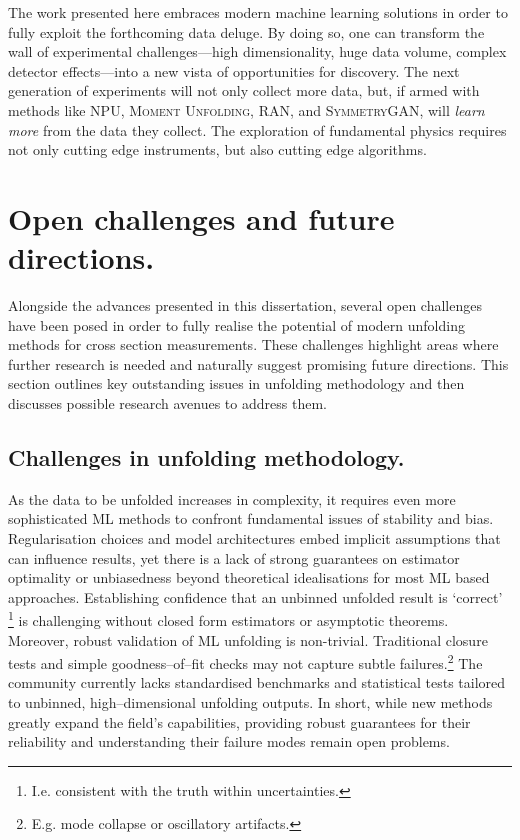         The work presented here embraces modern machine learning solutions in order to fully exploit the forthcoming data deluge.
        By doing so, one can transform the wall of experimental challenges---high dimensionality, huge data volume, complex detector effects---into a new vista of opportunities for discovery.
        The next generation of experiments will not only collect more data, but, if armed with methods like NPU, \textsc{Moment Unfolding}, RAN, and \textsc{SymmetryGAN}, will \emph{learn more} from the data they collect.
        The exploration of fundamental physics requires not only cutting edge instruments, but also cutting edge algorithms.

\section{Open challenges and future directions.}
\sectionminitoc
    Alongside the advances presented in this dissertation, several open challenges have been posed in order to fully realise the potential of modern unfolding methods for cross section measurements.
    These challenges highlight areas where further research is needed and naturally suggest promising future directions.
    This section outlines key outstanding issues in unfolding methodology and then discusses possible research avenues to address them.
        
    \subsection{Challenges in unfolding methodology.}
        As the data to be unfolded increases in complexity, it requires even more sophisticated ML methods to confront fundamental issues of stability and bias.
        Regularisation choices and model architectures embed implicit assumptions that can influence results, yet there is a lack of strong guarantees on estimator optimality or unbiasedness beyond theoretical idealisations for most ML based approaches.
        Establishing confidence that an unbinned unfolded result is `correct' \footnote{I.e. consistent with the truth within uncertainties.} is challenging without closed form estimators or asymptotic theorems.
        Moreover, robust validation of ML unfolding is non-trivial.
        Traditional closure tests and simple goodness--of--fit checks may not capture subtle failures.\footnote{E.g. mode collapse or oscillatory artifacts.}
        The community currently lacks standardised benchmarks and statistical tests tailored to unbinned, high--dimensional unfolding outputs.
        In short, while new methods greatly expand the field's capabilities, providing robust guarantees for their reliability and understanding their failure modes remain open problems.
        
